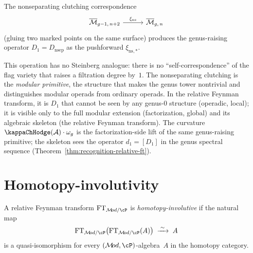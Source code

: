 \begin{remark}
\label{rem:nonsep-clutching-primitive}
The nonseparating clutching correspondence
\[
\begin{tikzcd}[column sep=3em]
\overline{\cM}_{g-1,\, n+2}
 \ar[r, "\xi_{\mathrm{ns}}"] &
\overline{\cM}_{g,\,n}
\end{tikzcd}
\]
(gluing two marked points on the same surface) produces the
genus-raising operator $D_1 = D_{\mathrm{nsep}}$ as the
pushforward $\xi_{\mathrm{ns},\ast}$.

This operation has no Steinberg analogue: there is no
``self-correspondence'' of the flag variety that raises a
filtration degree by~$1$. The nonseparating clutching is the
\emph{modular primitive}, the structure that makes the genus
tower nontrivial and distinguishes modular operads from ordinary
operads. In the relative Feynman transform, it is $D_1$ that
cannot be seen by any genus-$0$ structure (operadic, local); it is
visible only to the full modular extension (factorization, global)
and its algebraic skeleton (the relative Feynman transform). The
curvature $\kappaChHodge(\cA) \cdot \omega_g$ is the factorization-side
lift of the same genus-raising primitive; the skeleton sees the
operator $d_1=[D_1]$ in the genus spectral sequence
(Theorem~\ref{thm:recognition-relative-ft}).
\end{remark}


\section{Homotopy-involutivity}
\label{sec:rft-involutivity}

\begin{definition}
\label{def:relative-homotopy-involutivity}
A relative Feynman transform $\FT_{\cM\!od / \cP}$ is
\emph{homotopy-involutive} if the natural map
\[
\FT_{\cM\!od / \cP}\bigl(\FT_{\cM\!od / \cP}(A)\bigr)
\;\xrightarrow{\;\sim\;}\; A
\]
is a quasi-isomorphism for every $(\cM\!od, \cP)$-algebra~$A$
in the homotopy category.
\end{definition}


